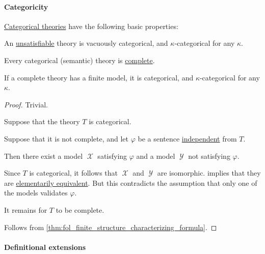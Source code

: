 \paragraph{Categoricity}

\begin{proposition}\label{thm:fol_categorical_theories}
  \hyperref[def:fol_theory]{Categorical theories} have the following basic properties:
  \begin{thmenum}
     An \hyperref[def:fol_semantics/satisfaction]{unsatisfiable} theory is vacuously categorical, and \( \kappa \)-categorical for any \( \kappa \).

     Every categorical (semantic) theory is \hyperref[def:fol_theory/complete]{complete}.

     If a complete theory has a finite model, it is categorical, and \( \kappa \)-categorical for any \( \kappa \).
  \end{thmenum}
\end{proposition}
\begin{proof}
   Trivial.

   Suppose that the theory \( T \) is categorical.

  Suppose that it is not complete, and let \( \varphi \) be a sentence \hyperref[def:logical_independence]{independent} from \( T \).

  Then there exist a model \( \mscrX \) satisfying \( \varphi \) and a model \( \mscrY \) not satisfying \( \varphi \).

  Since \( T \) is categorical, it follows that \( \mscrX \) and \( \mscrY \) are isomorphic.  implies that they are \hyperref[def:elementary_equivalence]{elementarily equivalent}. But this contradicts the assumption that only one of the models validates \( \varphi \).

  It remains for \( T \) to be complete.

   Follows from \cref{thm:fol_finite_structure_characterizing_formula}.
\end{proof}

\paragraph{Definitional extensions}

